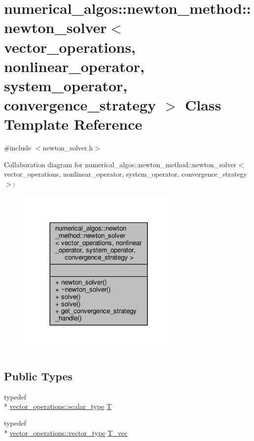 \hypertarget{classnumerical__algos_1_1newton__method_1_1newton__solver}{\section{numerical\-\_\-algos\-:\-:newton\-\_\-method\-:\-:newton\-\_\-solver$<$ vector\-\_\-operations, nonlinear\-\_\-operator, system\-\_\-operator, convergence\-\_\-strategy $>$ Class Template Reference}
\label{classnumerical__algos_1_1newton__method_1_1newton__solver}
}


{\ttfamily \#include $<$newton\-\_\-solver.\-h$>$}



Collaboration diagram for numerical\-\_\-algos\-:\-:newton\-\_\-method\-:\-:newton\-\_\-solver$<$ vector\-\_\-operations, nonlinear\-\_\-operator, system\-\_\-operator, convergence\-\_\-strategy $>$\-:\nopagebreak
\begin{figure}[H]
\begin{center}
\leavevmode
\includegraphics[width=228pt]{classnumerical__algos_1_1newton__method_1_1newton__solver__coll__graph}
\end{center}
\end{figure}
\subsection*{Public Types}
\begin{DoxyCompactItemize}
\item 
typedef \\*
\hyperlink{structcpu__vector__operations_aca6b216aa1fb172df83d98350e94fd61}{vector\-\_\-operations\-::scalar\-\_\-type} \hyperlink{classnumerical__algos_1_1newton__method_1_1newton__solver_ad3e4bf5e0eec7f6f103f27378d8b9be7}{T}
\item 
typedef \\*
\hyperlink{structcpu__vector__operations_a1962836df596ce262704d208e9a6d8f9}{vector\-\_\-operations\-::vector\-\_\-type} \hyperlink{classnumerical__algos_1_1newton__method_1_1newton__solver_afc800f3277daaae0e778d366f857b43f}{T\-\_\-vec}
\end{DoxyCompactItemize}
